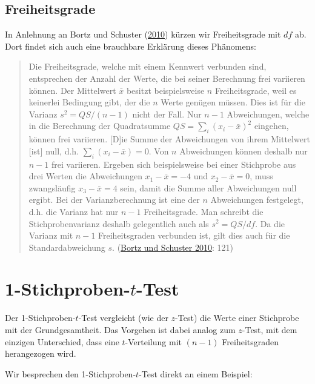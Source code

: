 \documentclass[
  11pt,
  ngerman,
  a4paper,
]{report}
\begin{document}
\hypertarget{freiheitsgrade}{%
\subsection{Freiheitsgrade}\label{freiheitsgrade}}

In Anlehnung an Bortz und Schuster (\protect\hyperlink{ref-bortz}{2010}) kürzen wir Freiheitsgrade mit \(\mathit{df}\) ab. Dort findet sich auch eine brauchbare Erklärung dieses Phänomens:

\begin{quote}
Die Freiheitsgrade, welche mit einem Kennwert verbunden sind, entsprechen der Anzahl der Werte, die bei seiner Berechnung frei variieren können. Der Mittelwert \(\bar{x}\) besitzt beispielsweise \(n\) Freiheitsgrade, weil es keinerlei Bedingung gibt, der die \(n\) Werte genügen müssen. Dies ist für die Varianz \(s^2=\mathit{QS}/(n-1)\) nicht der Fall. Nur \(n-1\) Abweichungen, welche in die Berechnung der Quadratsumme \(\mathit{QS}=\sum_i(x_i-\bar{x})^2\) eingehen, können frei variieren. {[}D{]}ie Summe der Abweichungen von ihrem Mittelwert {[}ist{]} null, d.h. \(\sum_i(x_i-\bar{x})=0\). Von \(n\) Abweichungen können deshalb nur \(n - 1\) frei variieren. Ergeben sich beispielsweise bei einer Stichprobe aus drei Werten die Abweichungen \(x_1 - \bar{x} = -4\) und \(x_2 - \bar{x} = 0\), muss zwangsläufig \(x_3 -\bar{x} = 4\) sein, damit die Summe aller Abweichungen null ergibt. Bei der Varianzberechnung ist eine der \(n\) Abweichungen festgelegt, d.h. die Varianz hat nur \(n - 1\) Freiheitsgrade. Man schreibt die Stichprobenvarianz deshalb gelegentlich auch als \(s^2 = \mathit{QS}/\mathit{df}\). Da die Varianz mit \(n - 1\) Freiheitsgraden verbunden ist, gilt dies auch für die Standardabweichung \(s\). (\protect\hyperlink{ref-bortz}{Bortz und Schuster 2010}: 121)
\end{quote}

\hypertarget{t-test}{%
\section{\texorpdfstring{1-Stichproben-\(t\)-Test}{1-Stichproben-t-Test}}\label{t-test}}

Der 1-Stichproben-\(t\)-Test vergleicht (wie der \(z\)-Test) die Werte einer Stichprobe mit der Grundgesamtheit. Das Vorgehen ist dabei analog zum \(z\)-Test, mit dem einzigen Unterschied, dass eine \(t\)-Verteilung mit \((n-1)\) Freiheitsgraden herangezogen wird.

Wir besprechen den 1-Stichproben-\(t\)-Test direkt an einem Beispiel:
\end{document}
